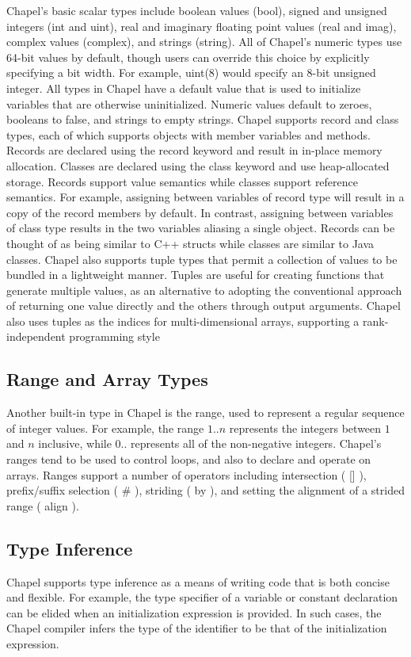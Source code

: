 \documentclass[letterpaper]{article}
\begin{document}
Chapel’s basic scalar types include boolean values (bool), signed and unsigned integers (int and uint), real and imaginary floating point values (real and imag), complex values (complex), and strings (string). 
All of Chapel’s numeric types use 64-bit values by default, though users can override this choice by explicitly specifying a bit width. For example, uint(8) would specify an 8-bit unsigned integer. All types in Chapel have a default value that is used to initialize variables that are otherwise uninitialized. Numeric values default to zeroes, booleans to false, and strings to empty strings.
Chapel supports record and class types, each of which supports objects with member variables and methods.
Records are declared using the record keyword and result in in-place memory allocation. Classes are declared
using the class keyword and use heap-allocated storage. Records support value semantics while classes support reference semantics. For example, assigning between variables of record type will result in a copy of the record members by default. In contrast, assigning between variables of class type results in the two variables aliasing a single object. Records can be thought of as being similar to C++ structs while classes are similar to Java classes. Chapel also supports tuple types that permit a collection of values to be bundled in a lightweight manner. Tuples are useful for creating functions that generate multiple values, as an alternative to adopting the conventional approach of returning one value directly and the others through output arguments. Chapel also uses tuples as the indices for multi-dimensional arrays, supporting a rank-independent programming style


\subsection{Range and Array Types}
Another built-in type in Chapel is the range, used to represent a regular sequence of integer
values. For example, the range $1..n$ represents the integers between $1$ and $n$ inclusive, while
$ 0..$ represents all of the non-negative integers. Chapel’s ranges tend to be used to control loops, and also to declare and operate on arrays. Ranges support a number of operators including intersection ( [] ), prefix/suffix selection ( \# ), striding ( by ), and setting the alignment of a strided range ( align ). 

\subsection{Type Inference}
Chapel supports type inference as a means of writing code that is both concise and flexible. For
example, the type specifier of a variable or constant declaration can be elided when an initialization expression is provided. In such cases, the Chapel compiler infers the type of the identifier to be that of the initialization expression.
\end{document}

